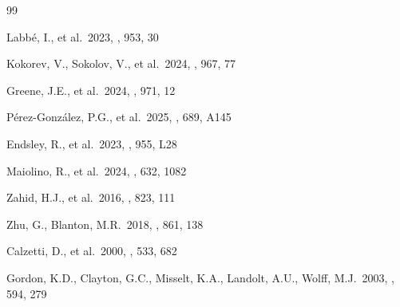\documentclass[apjl,twocolumn,longbibliography,linenumbers]{aastex701}
\begin{document}
\begin{thebibliography}{99}


Labb\'e, I., et al.\ 2023, \apj, 953, 30

Kokorev, V., Sokolov, V., et al.\ 2024, \apj, 967, 77

Greene, J.E., et al.\ 2024, \apj, 971, 12

P\'erez-Gonz\'alez, P.G., et al.\ 2025, \aap, 689, A145


Endsley, R., et al.\ 2023, \apjl, 955, L28

Maiolino, R., et al.\ 2024, \nat, 632, 1082



Zahid, H.J., et al.\ 2016, \apj, 823, 111

Zhu, G., Blanton, M.R.\ 2018, \apj, 861, 138


Calzetti, D., et al.\ 2000, \apj, 533, 682

Gordon, K.D., Clayton, G.C., Misselt, K.A.,
Landolt, A.U., Wolff, M.J.\ 2003, \apj, 594, 279


\end{thebibliography}
\end{document}
